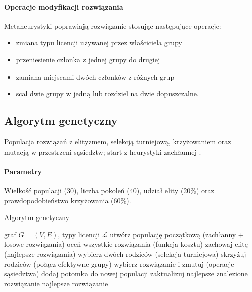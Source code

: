 \paragraph{Operacje modyfikacji rozwiązania}
Metaheurystyki poprawiają rozwiązanie stosując następujące operacje:
\begin{itemize}
  \item zmiana typu licencji używanej przez właściciela grupy
  \item przeniesienie członka z jednej grupy do drugiej
  \item zamiana miejscami dwóch członków z różnych grup
  \item scal dwie grupy w jedną lub rozdziel na dwie dopuszczalne.
\end{itemize}

\subsection{Algorytm genetyczny}\label{subsec:ga}
Populacja rozwiązań z elityzmem, selekcją turniejową, krzyżowaniem oraz mutacją w przestrzeni sąsiedztw; start z heurystyki zachłannej \cite{holland1975,goldberg1989}.

\paragraph{Parametry}
Wielkość populacji (30), liczba pokoleń (40), udział elity (20\%) oraz prawdopodobieństwo krzyżowania (60\%).

\begin{algorithm}[H]
\caption{Algorytm genetyczny}
\label{alg:ga}
\begin{algorithmic}[1]
\Require graf $G=(V,E)$, typy licencji $\mathcal{L}$
\State utwórz populację początkową (zachłanny + losowe rozwiązania)
  \State oceń wszystkie rozwiązania (funkcja kosztu)
  \State zachowaj elitę (najlepsze rozwiązania)
      \State wybierz dwóch rodziców (selekcja turniejowa)
      \State skrzyżuj rodziców (połącz efektywne grupy)
    \Else
      \State wybierz rozwiązanie i zmutuj (operacje sąsiedztwa)
    \EndIf
    \State dodaj potomka do nowej populacji
  \EndWhile
  \State zaktualizuj najlepsze znalezione rozwiązanie
\EndFor
\State \Return najlepsze rozwiązanie
\end{algorithmic}
\end{algorithm}



